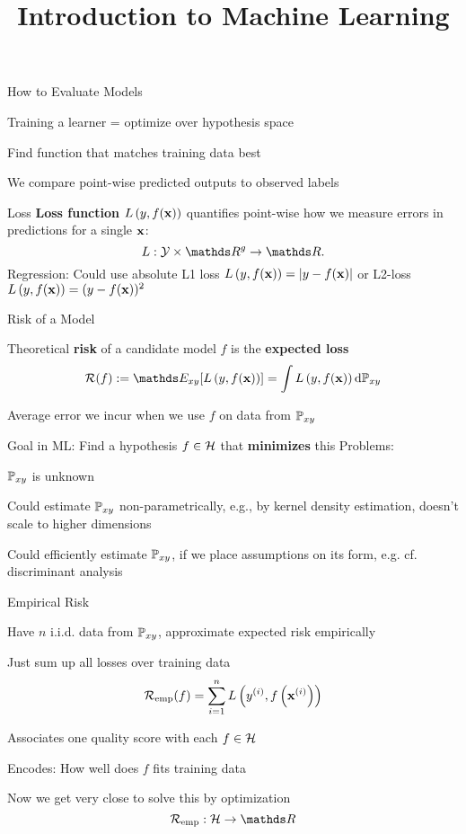 \documentclass[11pt,compress,t,notes=noshow, xcolor=table]{beamer}
\title{Introduction to Machine Learning}
\begin{document}


\begin{framei}{How to Evaluate Models}
\item Training a learner = optimize over hypothesis space
\item Find function that matches training data best
\item We compare point-wise predicted outputs to 
observed labels
\vfill
{} %
\end{framei}


\begin{frame2}{Loss}
\textbf{Loss function} $L\left(y, f(\mathbf{x})\right)$ quantifies point-wise how we measure errors in predictions for a single $\mathbf{x}$:
$$
L: \Yspace \times \R^g \to \R.
$$
Regression: Could use absolute L1 loss  $L\left(y, f(\mathbf{x})\right) = |y-f(\mathbf{x})|$
or L2-loss $L\left(y, f(\mathbf{x})\right) = (y - f(\mathbf{x}))^2$
\end{frame2}


\begin{framei}{Risk of a Model}
\item Theoretical \textbf{risk} of a candidate model $f$ is the \textbf{expected loss}
$$ \riskf := \E_{xy} [\Lxy] = \int \Lxy \text{d}\Pxy $$
\item Average error we incur when we use $f$ on data from $\mathbb{P}_{xy}$
\item Goal in ML: Find a hypothesis $f \in \mathcal{H}$ that \textbf{minimizes} this
\vfill
Problems:
\item $\mathbb{P}_{xy}$ is unknown
\item Could estimate $\mathbb{P}_{xy}$ non-parametrically, e.g., by kernel density estimation,  doesn't scale to higher dimensions
\item Could efficiently estimate $\mathbb{P}_{xy}$, if we place assumptions on its form, e.g. cf. discriminant analysis
\end{framei}


\begin{framei}{Empirical Risk}
\item Have $n$ i.i.d. data from $\mathbb{P}_{xy}$, approximate expected risk empirically
\item Just sum up all losses over training data
$$
\mathcal{R}_{\text{emp}}(f) = \sum\limits_{i=1}^n L\left(y^{(i)}, f\left(\mathbf{x}^{(i)}\right)\right)
$$
\item Associates one quality score with each $f \in \mathcal{H}$
\item Encodes: How well does $f$ fits training data
\item Now we get very close to solve this by optimization 
$$
\riske: \Hspace \to \R
$$
\end{framei}
\end{document}
